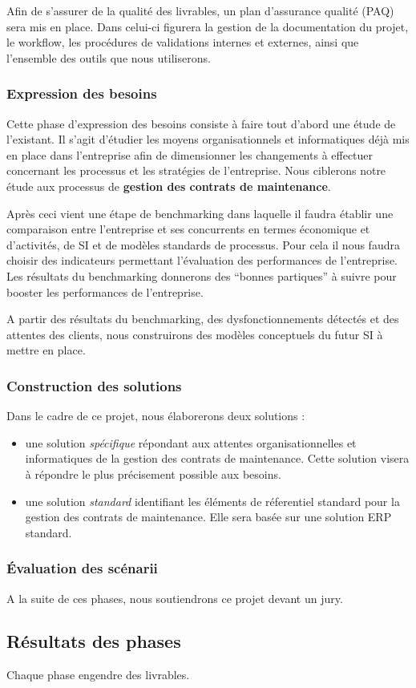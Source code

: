 \documentclass[a4paper,11pt]{report}
\begin{document}
Afin de s'assurer de la qualit\'e des livrables, un plan d'assurance qualit\'e (PAQ) sera mis en place. Dans celui-ci figurera la gestion de la documentation du projet,
le workflow, les proc\'edures de validations internes et externes, ainsi que l'ensemble des outils que nous utiliserons.

\subsubsection*{Expression des besoins}

Cette phase d'expression des besoins consiste \`a faire tout d'abord une \'etude de l'existant.
Il s'agit d'\'etudier les moyens organisationnels et informatiques d\'ej\`a mis en place dans l'entreprise afin de dimensionner les changements \`a effectuer concernant les processus et les strat\'egies de l'entreprise.
Nous ciblerons notre étude aux processus de \textbf{gestion des contrats de maintenance}.

Après ceci vient une étape de benchmarking dans laquelle il faudra établir une comparaison entre l'entreprise et ses concurrents en termes \'economique et d'activités, de SI et de modèles standards de processus.
Pour cela il nous faudra choisir des indicateurs permettant l'évaluation des performances de l'entreprise. Les résultats du benchmarking donnerons des ``bonnes partiques'' à suivre pour booster les performances de l'entreprise.

A partir des résultats du benchmarking, des dysfonctionnements détectés et des  attentes des clients, nous construirons des modèles conceptuels du futur SI à mettre en place.

\subsubsection*{Construction des solutions}

Dans le cadre de ce projet, nous élaborerons deux solutions :

\begin{itemize}
 \item une solution \textit{spécifique} répondant aux attentes organisationnelles et informatiques de la gestion des contrats de maintenance. Cette solution visera à répondre le plus précisement possible aux besoins.
 \item une solution \textit{standard} identifiant les éléments de réferentiel standard pour la gestion des contrats de maintenance. Elle sera basée sur une solution ERP standard.
\end{itemize}

\subsubsection*{\'Evaluation des sc\'enarii}

A la suite de ces phases, nous soutiendrons ce projet devant un jury.

\subsection*{R\'esultats des phases}

Chaque phase engendre des livrables.

\end{document}
